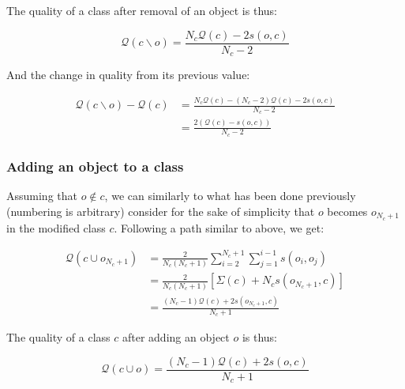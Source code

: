 \documentclass[a4paper,twoside]{article}
\begin{document}
The quality of a class after removal of an object is thus:

\begin{equation}
  \mathcal{Q}\left(c \smallsetminus o\right) = \frac{N_c \mathcal{Q}(c)  - 2s\left(o, c\right)}{N_c-2}
  \label{eq:newQual_remove}
\end{equation}

And the change in quality from its previous value:

\begin{equation} \label{deltaRemove}
  \begin{aligned}
    \mathcal{Q}\left(c \smallsetminus o\right) - \mathcal{Q}\left(c\right) & = \frac{N_c \mathcal{Q}(c)  - (N_c-2) \mathcal{Q}(c)  - 2s\left(o, c\right)}{N_c-2} \\
                                                                           & = \frac{2\left( \mathcal{Q}(c) - s\left(o, c\right)\right)}{N_c-2}
    \end{aligned}
\end{equation}


\subsubsection{Adding an object to a class}

Assuming that $o \notin c$, we can similarly to what has been done previously (numbering is arbitrary) consider for the sake of simplicity that $o$ becomes $o_{N_c+1}$ in the modified class $c$. Following a path similar to above, we get:

\begin{equation}
  \begin{aligned}
    \mathcal{Q}(c \cup o_{N_c+1}) & = \frac{2}{N_c(N_c+1)} \sum_{i=2}^{N_c+1} \sum_{j=1}^{i-1} s\left(o_i, o_j\right) \\
                                & = \frac{2}{N_c(N_c+1)} \left[\Sigma(c) + N_c s\left(o_{N_c+1}, c\right)\right] \\
                                & = \frac{(N_c-1) \mathcal{Q}(c)  + 2s\left(o_{N_c+1}, c\right)}{N_c+1}
  \end{aligned}
\end{equation}

The quality of a class $c$ after adding an object $o$ is thus:

\begin{equation}
  \mathcal{Q}\left(c \cup o\right) = \frac{(N_c-1) \mathcal{Q}(c)  + 2s\left(o, c\right)}{N_c+1}
  \label{eq:newQual_add}
\end{equation}
\end{document}
